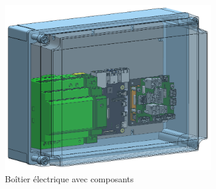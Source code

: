 \begin{figure}[H]
    \centering
    \includegraphics[width = 0.8\textwidth]{assets/figures/AssemblageBoitierElectrique.png}
    \caption{Boîtier électrique avec composants}
    \label{fig:AssBoitierElec}
\end{figure}